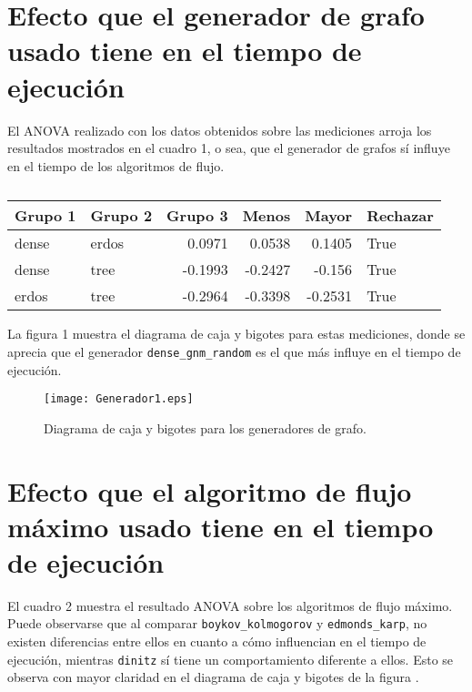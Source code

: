 \documentclass{article}
\begin{document}
 

\section*{Efecto que el generador de grafo usado tiene en el tiempo de ejecución}

El ANOVA realizado con los datos obtenidos sobre las mediciones arroja los resultados mostrados en el cuadro 1, o sea, que el generador de grafos sí influye en el tiempo de los algoritmos de flujo.

\begin{table}[htbp]
  \centering
  \caption{}
    \begin{tabular}{|l|l|r|r|r|l|}
    \toprule
    \rowcolor[rgb]{ .357,  .608,  .835} \textbf{Grupo 1} & \textbf{Grupo 2} & \multicolumn{1}{l|}{\textbf{Grupo 3}} & \multicolumn{1}{l|}{\textbf{Menos}} & \multicolumn{1}{l|}{\textbf{Mayor}} & \textbf{Rechazar} \\
    \midrule
    dense & erdos & 0.0971 & 0.0538 & 0.1405 & True \\
    \midrule
    dense & tree  & -0.1993 & -0.2427 & -0.156 & True \\
    \midrule
    erdos & tree  & -0.2964 & -0.3398 & -0.2531 & True \\
    \bottomrule
    \end{tabular}
  \label{tab:Cuadro 1}
\end{table}

La figura 1 muestra el diagrama de caja y bigotes para estas mediciones, donde se aprecia que el generador \texttt{dense\_gnm\_random} es el que más influye en el tiempo de ejecución.

\begin{figure}
\begin{center}
  \texttt{[image: Generador1.eps]}
\end{center}
\vspace*{-8mm}
\caption{Diagrama de caja y bigotes para los generadores de grafo.}
  \label{Figura 2} 
\end{figure}

\section*{Efecto que el algoritmo de flujo máximo usado tiene en el tiempo de ejecución}

El cuadro 2 muestra el resultado ANOVA sobre los algoritmos de flujo máximo. Puede observarse que al comparar \texttt{boykov\_kolmogorov} y \texttt{edmonds\_karp}, no existen diferencias entre ellos en cuanto a cómo influencian en el tiempo de ejecución, mientras \texttt{dinitz} sí tiene un comportamiento diferente a ellos. Esto se observa con mayor claridad en el diagrama de caja y bigotes de la figura \pageref{Figura 3}.
\end{document}
